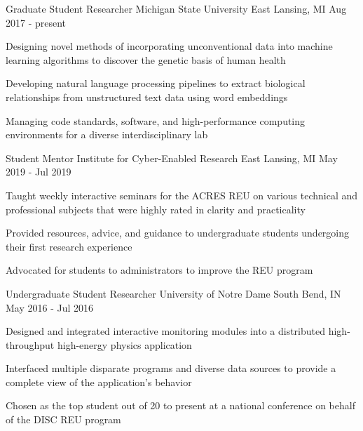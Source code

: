 

\begin{cventries}

  \cventry
  {Graduate Student Researcher} %
  {Michigan State University} %
  {East Lansing, MI} %
  {Aug 2017 - present} %
  {
    \begin{cvitems} %
      \item {Designing novel methods of incorporating unconventional data into machine learning algorithms to discover the genetic basis of human health}
      \item {Developing natural language processing pipelines to extract biological relationships from unstructured text data using word embeddings}
      \item {Managing code standards, software, and high-performance computing environments for a diverse interdisciplinary lab}
    \end{cvitems}
  }

  \cventry
  {Student Mentor} %
  {Institute for Cyber-Enabled Research} %
  {East Lansing, MI} %
  {May 2019 - Jul 2019} %
  {
    \begin{cvitems} %
      \item {Taught weekly interactive seminars for the ACRES REU on various technical and professional subjects that were highly rated in clarity and practicality}
      \item {Provided resources, advice, and guidance to undergraduate students undergoing their first research experience}
      \item {Advocated for students to administrators to improve the REU program}
    \end{cvitems}
  }

  \cventry
  {Undergraduate Student Researcher} %
  {University of Notre Dame} %
  {South Bend, IN} %
  {May 2016 - Jul 2016} %
  {
    \begin{cvitems} %
      \item {Designed and integrated interactive monitoring modules into a distributed high-throughput high-energy physics application}
      \item {Interfaced multiple disparate programs and diverse data sources to provide a complete view of the application's behavior}
      \item {Chosen as the top student out of 20 to present at a national conference on behalf of the DISC REU program}
    \end{cvitems}
  }


\end{cventries}
